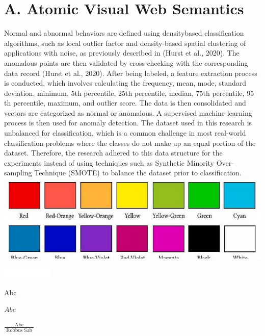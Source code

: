 \documentclass[10pt]{article}
\begin{document}
\section{A. Atomic Visual Web Semantics}
Normal and abnormal behaviors are defined using densitybased classification algorithms, such as local outlier factor and density-based spatial clustering of applications with noise, as previously described in (Hurst et al., 2020). The anomalous points are then validated by cross-checking with the corresponding data record (Hurst et al., 2020). After being labeled, a feature extraction process is conducted, which involves calculating the frequency, mean, mode, standard deviation, minimum, 5th percentile, 25th percentile, median, 75th percentile, 95 th percentile, maximum, and outlier score. The data is then consolidated and vectors are categorized as normal or anomalous. A supervised machine learning process is then used for anomaly detection. The dataset used in this research is unbalanced for classification, which is a common challenge in most real-world classification problems where the classes do not make up an equal portion of the dataset. Therefore, the research adhered to this data structure for the experiments instead of using techniques such as Synthetic Minority Over-sampling Technique (SMOTE) to balance the dataset prior to classification.
\includegraphics[max width=\textwidth, center]{2023_01_16_edd5388a973e00ef26e3g-2}

\begin{center}
\includegraphics[max width=\textwidth]{2023_01_16_edd5388a973e00ef26e3g-2(1)}
\end{center}

$\mathrm{Abc}$

$A b c$

$\frac{\mathrm{Abc}}{\text { Robbos Sab }}$
\end{document}
